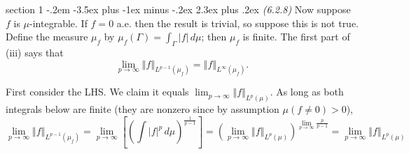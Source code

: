 \documentclass[12pt]{article}
\makeatletter
\theoremstyle{norm}
\newtheorem{lem}[thm]{Lemma}
\newcommand{\rc}[1]{\frac{1}{#1}}
\newcommand{\Ga}[0]{\Gamma}
\newcommand{\ba}[1]{\left[ {#1} \right]}
\newcommand{\pa}[1]{\left( {#1} \right)}
\newcommand{\ve}[1]{\left\Vert {#1}\right\Vert}
\newcommand{\iy}[0]{\infty}
\newenvironment{problem}{\@startsection
       {section}
       {1}
       {-.2em}
       {-3.5ex plus -1ex minus -.2ex}
       {2.3ex plus .2ex}
       {\pagebreak[3]%
       \large\bf\noindent{Problem }
       }
       }
       {%
       }
\makeatother
\begin{document}
\begin{problem}{\it (6.2.8)}
Now suppose $f$ is $\mu$-integrable. If $f=0$ a.e. then the result is trivial, so suppose this is not true. 
%
Define the measure $\mu_f$ by $\mu_f(\Ga)=\int_{\Ga}|f|\,d\mu$; then $\mu_f$ is finite. The first part of (iii) says that
\begin{equation}\label{finitetoinf}
\lim_{p\to \iy}\ve{f}_{L^{p-1}(\mu_f)}=\ve{f}_{L^{\iy}(\mu_f)}.
\end{equation}

First consider the LHS. We claim it equals $\lim_{p\to \iy}\ve{f}_{L^p(\mu)}$. As long as both integrals below are finite (they are nonzero since by assumption $\mu(f\ne0)>0$), 
\[
\lim_{p\to \iy} \ve{f}_{L^{p-1}(\mu_f)}=\lim_{p\to \iy} \ba{\pa{\int |f|^{p}\,d\mu}^{\rc{p-1}}}=\pa{\lim_{p\to \iy} \ve{f}_{L^p(\mu)}}^{\lim_{p\to \iy}\frac p{p-1}}=\lim_{p\to \iy} \ve{f}_{L^p(\mu)}\]
%


\end{problem}
\end{document}

